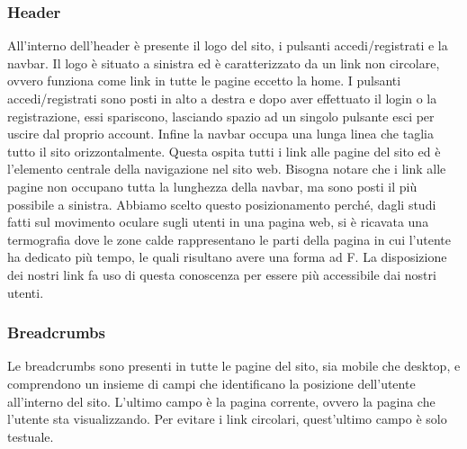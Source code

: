 \subsubsection{Header}
All’interno dell’header è presente il logo del sito, i pulsanti accedi/registrati e la navbar.
Il logo è situato a sinistra ed è caratterizzato da un link non circolare, ovvero funziona come link in tutte le pagine eccetto la home.
I pulsanti accedi/registrati sono posti in alto a destra e dopo aver effettuato il login o la registrazione, essi spariscono, lasciando spazio ad un singolo pulsante esci per uscire dal proprio account.
Infine la navbar occupa una lunga linea che taglia tutto il sito orizzontalmente.
Questa ospita tutti i link alle pagine del sito ed è l’elemento centrale della navigazione nel sito web.
Bisogna notare che i link alle pagine non occupano tutta la lunghezza della navbar, ma sono posti il più possibile a sinistra.
Abbiamo scelto questo posizionamento perché, dagli studi fatti sul movimento oculare sugli utenti in una pagina web, si è ricavata una termograﬁa dove le zone calde rappresentano le parti della pagina in cui l’utente ha dedicato più tempo, le quali risultano avere una forma ad F.
La disposizione dei nostri link fa uso di questa conoscenza per essere più accessibile dai nostri utenti.

\subsubsection{Breadcrumbs}
Le breadcrumbs sono presenti in tutte le pagine del sito, sia mobile che desktop, e comprendono un insieme di campi che identiﬁcano la posizione dell’utente all’interno del sito. L’ultimo campo è la pagina corrente, ovvero la pagina che l’utente sta visualizzando. Per evitare i link circolari, quest’ultimo campo è solo testuale.

